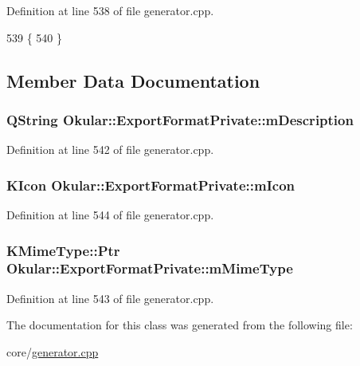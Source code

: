 Definition at line 538 of file generator.\+cpp.


\begin{DoxyCode}
539         \{
540         \}
\end{DoxyCode}


\subsection{Member Data Documentation}
\hypertarget{classOkular_1_1ExportFormatPrivate_ab09623822827ddc8b18ec6732ce76e9d}{
\subsubsection[{m\+Description}]{\setlength{\rightskip}{0pt plus 5cm}Q\+String Okular\+::\+Export\+Format\+Private\+::m\+Description}}\label{classOkular_1_1ExportFormatPrivate_ab09623822827ddc8b18ec6732ce76e9d}


Definition at line 542 of file generator.\+cpp.

\hypertarget{classOkular_1_1ExportFormatPrivate_ab1d476d68599e933cd2692dc18c57d17}{
\subsubsection[{m\+Icon}]{\setlength{\rightskip}{0pt plus 5cm}K\+Icon Okular\+::\+Export\+Format\+Private\+::m\+Icon}}\label{classOkular_1_1ExportFormatPrivate_ab1d476d68599e933cd2692dc18c57d17}


Definition at line 544 of file generator.\+cpp.

\hypertarget{classOkular_1_1ExportFormatPrivate_a93c0752151f98999936ef26dbb598ece}{
\subsubsection[{m\+Mime\+Type}]{\setlength{\rightskip}{0pt plus 5cm}K\+Mime\+Type\+::\+Ptr Okular\+::\+Export\+Format\+Private\+::m\+Mime\+Type}}\label{classOkular_1_1ExportFormatPrivate_a93c0752151f98999936ef26dbb598ece}


Definition at line 543 of file generator.\+cpp.



The documentation for this class was generated from the following file\+:\begin{DoxyCompactItemize}
\item 
core/\hyperlink{generator_8cpp}{generator.\+cpp}\end{DoxyCompactItemize}
